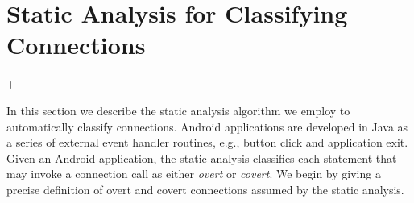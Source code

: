 \section{Static Analysis for Classifying Connections}
\label{sec:analysis}

\lstMakeShortInline[basicstyle=\scriptsize\ttfamily,keywordstyle=\color{DarkPurple},breaklines=false]+

In this section we describe the static analysis algorithm we employ to
automatically classify connections.  Android applications are
developed in Java as a series of external event handler routines,
e.g., button click and application exit.  Given an Android
application, the static analysis classifies each statement that may
invoke a connection call as either {\it overt} or {\it covert}.  We
begin by giving a precise definition of overt and covert connections
assumed by the static analysis.



